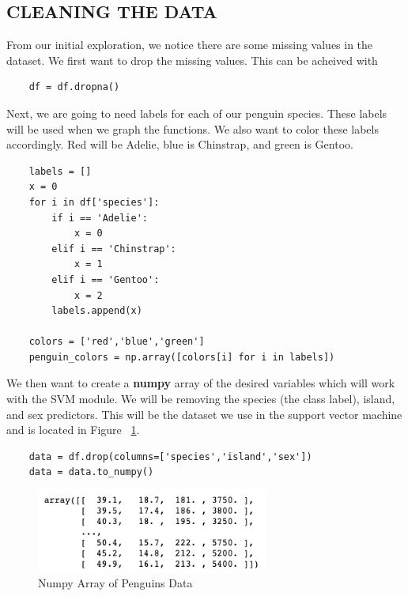\documentclass[12pt]{article}
\begin{document}
\subsection{CLEANING THE DATA}

From our initial exploration, we notice there are some missing values in the dataset. We first want to drop the missing values. This can be acheived with

\begin{verbatim}
    df = df.dropna()
\end{verbatim}

Next, we are going to need labels for each of our penguin species. These labels will be used when we graph the functions. We also want to color these labels accordingly. Red will be Adelie, blue is Chinstrap, and green is Gentoo.

\begin{verbatim}
    labels = []
    x = 0
    for i in df['species']:
        if i == 'Adelie':
            x = 0
        elif i == 'Chinstrap':
            x = 1
        elif i == 'Gentoo':
            x = 2
        labels.append(x)
    
    colors = ['red','blue','green']
    penguin_colors = np.array([colors[i] for i in labels])
\end{verbatim}

We then want to create a \textbf{numpy} array of the desired variables which will work with the SVM module. We will be removing the species (the class label), island, and sex predictors. This will be the dataset we use in the support vector machine and is located in Figure ~\ref{fig_penguins_numpy}.

\begin{verbatim}
    data = df.drop(columns=['species','island','sex'])
    data = data.to_numpy()
\end{verbatim}

\begin{figure}[H]
    \centering
    \includegraphics[width=3in]{Figures/penguins/penguins_numpy_data.png}
    \caption{Numpy Array of Penguins Data}
    \label{fig_penguins_numpy}
\end{figure}
\end{document}
